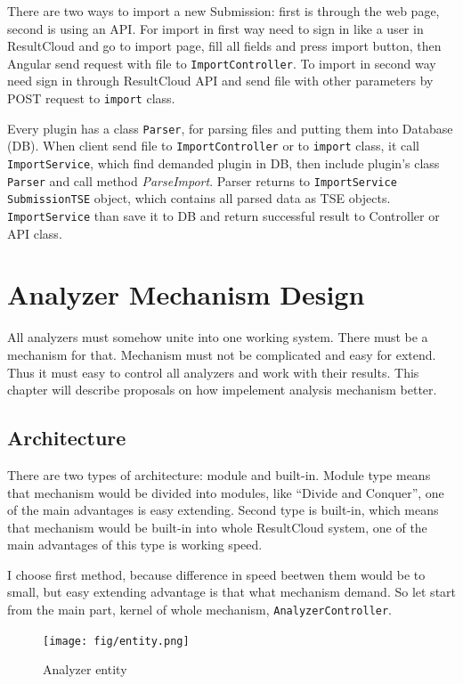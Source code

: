 There are two ways to import a new Submission: first is through the web page, second is using an API. For import in first way need to sign in like a user in ResultCloud and go to import page, fill all fields and press import button, then Angular send request with file to \texttt{ImportController}. To import in second way need sign in through ResultCloud API and send file with other parameters by POST request to \texttt{import} class. 

Every plugin has a class \texttt{Parser}, for parsing files and putting them into Database (DB). When client send file to \texttt{ImportController} or to \texttt{import} class, it call \texttt{ImportService}, which find demanded plugin in DB, then include plugin's class \texttt{Parser} and call method \emph{ParseImport}. Parser returns to \texttt{ImportService} \texttt{SubmissionTSE} object, which contains all parsed data as TSE objects. \texttt{ImportService} than save it to DB and return successful result to Controller or API class.

\chapter{Analyzer Mechanism Design}
\label{ch:analyzer_proposal}

All analyzers must somehow unite into one working system. There must be a mechanism for that. Mechanism must not be complicated and easy for extend. Thus it must easy to control all analyzers and work with their results. This chapter will describe proposals on how impelement analysis mechanism better.

\section{Architecture} 

There are two types of architecture: module and built-in. Module type means that mechanism would be divided into modules, like “Divide and Conquer”, one of the main advantages is easy extending. Second type is built-in, which means that mechanism would be built-in into whole ResultCloud system, one of the main advantages of this type is working speed.

I choose first method, because difference in speed beetwen them would be to small, but easy extending advantage is that what mechanism demand. So let start from the main part, kernel of whole mechanism, \texttt{AnalyzerController}. 

\begin{figure}
  \centering
    \texttt{[image: fig/entity.png]}
  \caption{Analyzer entity}
  \label{fig:entity}
\end{figure}

